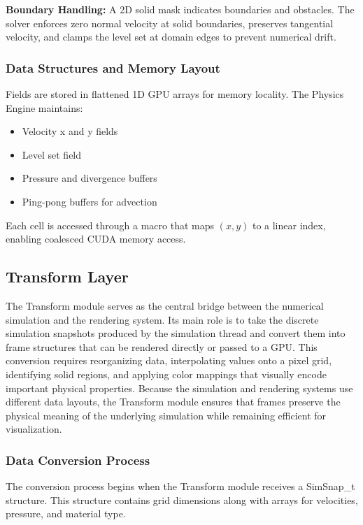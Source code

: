 \documentclass[12pt,a4paper]{article}
\begin{document}
\textbf{Boundary Handling:} A 2D solid mask indicates boundaries and obstacles. The solver enforces zero normal velocity at solid boundaries, preserves tangential velocity, and clamps the level set at domain edges to prevent numerical drift.

\subsubsection{Data Structures and Memory Layout}

Fields are stored in flattened 1D GPU arrays for memory locality. The Physics Engine maintains:
\begin{itemize}
    \item Velocity x and y fields
    \item Level set field
    \item Pressure and divergence buffers
    \item Ping-pong buffers for advection
\end{itemize}

Each cell is accessed through a macro that maps $(x, y)$ to a linear index, enabling coalesced CUDA memory access.

\subsection{Transform Layer}

The Transform module serves as the central bridge between the numerical simulation and the rendering system. Its main role is to take the discrete simulation snapshots produced by the simulation thread and convert them into frame structures that can be rendered directly or passed to a GPU. This conversion requires reorganizing data, interpolating values onto a pixel grid, identifying solid regions, and applying color mappings that visually encode important physical properties. Because the simulation and rendering systems use different data layouts, the Transform module ensures that frames preserve the physical meaning of the underlying simulation while remaining efficient for visualization.

\subsubsection{Data Conversion Process}

The conversion process begins when the Transform module receives a SimSnap\_t structure. This structure contains grid dimensions along with arrays for velocities, pressure, and material type.
\end{document}
